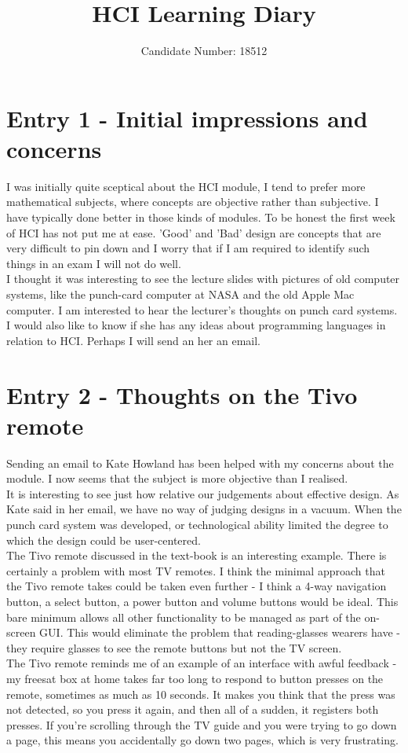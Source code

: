 \documentclass{article}
\title{HCI Learning Diary}
\author{Candidate Number: 18512}
\begin{document}
\maketitle
\section*{Entry 1 - Initial impressions and concerns}

\noindent I was initially quite sceptical about the HCI module, I tend to prefer more mathematical subjects, where concepts are objective rather than subjective. I have typically done better in those kinds of modules. To be honest the first week of HCI has not put me at ease. 'Good' and 'Bad' design are concepts that are very difficult to pin down and I worry that if I am required to identify such things in an exam I will not do well.
\\\indent I thought it was interesting to see the lecture slides with pictures of old computer systems, like the punch-card computer at NASA and the old Apple Mac computer. I am interested to hear the lecturer's thoughts on punch card systems. I would also like to know if she has any ideas about programming languages in relation to HCI. Perhaps I will send an her an email.

\section*{Entry 2 - Thoughts on the Tivo remote}

\noindent Sending an email to Kate Howland has been helped with my concerns about the module. I now seems that the subject is more objective than I realised.
\\\indent It is interesting to see just how relative our judgements about effective design. As Kate said in her email, we have no way of judging designs in a vacuum. When the punch card system was developed, or technological ability limited the degree to which the design could be user-centered.
\\\indent The Tivo remote discussed in the text-book is an interesting example. There is certainly a problem with most TV remotes. I think the minimal approach that the Tivo remote takes could be taken even further - I think a 4-way navigation button, a select button, a power button and volume buttons would be ideal. This bare minimum allows all other functionality to be managed as part of the on-screen GUI. This would eliminate the problem that reading-glasses wearers have - they require glasses to see the remote buttons but not the TV screen.
\\\indent The Tivo remote reminds me of an example of an interface with awful feedback - my freesat box at home takes far too long to respond to button presses on the remote, sometimes as much as 10 seconds. It makes you think that the press was not detected, so you press it again, and then all of a sudden, it registers both presses. If you're scrolling through the TV guide and you were trying to go down a page, this means you accidentally go down two pages, which is very frustrating.
\end{document}
